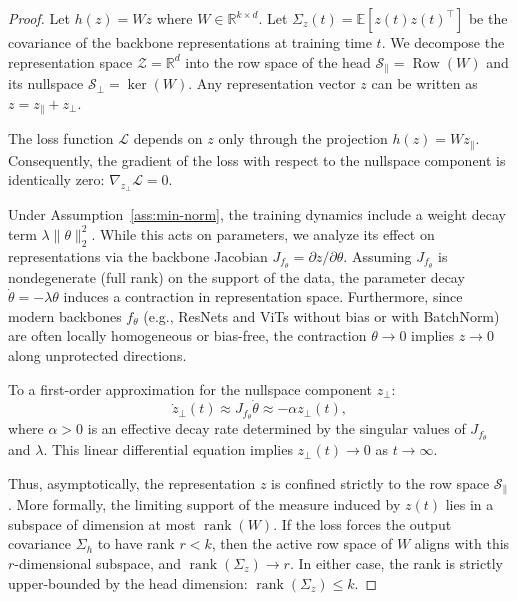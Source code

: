 \documentclass[10pt,a4paper]{amsart}
\begin{document}
\begin{proof}
Let $h(z) = Wz$ where $W \in \mathbb{R}^{k \times d}$. Let $\Sigma_z(t) = \mathbb{E}[z(t) z(t)^\top]$ be the covariance of the backbone representations at training time $t$. We decompose the representation space $\mathcal{Z} = \mathbb{R}^d$ into the row space of the head $\mathcal{S}_{\parallel} = \operatorname{Row}(W)$ and its nullspace $\mathcal{S}_{\perp} = \ker(W)$.
Any representation vector $z$ can be written as $z = z_{\parallel} + z_{\perp}$.

The loss function $\mathcal{L}$ depends on $z$ only through the projection $h(z) = W z_{\parallel}$. Consequently, the gradient of the loss with respect to the nullspace component is identically zero: $\nabla_{z_{\perp}} \mathcal{L} = 0$.

Under Assumption~\ref{ass:min-norm}, the training dynamics include a weight decay term $\lambda \|\theta\|^2_2$. While this acts on parameters, we analyze its effect on representations via the backbone Jacobian $J_{f_\theta} = \partial z / \partial \theta$. Assuming $J_{f_\theta}$ is nondegenerate (full rank) on the support of the data, the parameter decay $\dot{\theta} = -\lambda \theta$ induces a contraction in representation space. 
Furthermore, since modern backbones $f_\theta$ (e.g., ResNets and ViTs without bias or with BatchNorm) are often locally homogeneous or bias-free, the contraction $\theta \to 0$ implies $z \to 0$ along unprotected directions.

To a first-order approximation for the nullspace component $z_{\perp}$:
\begin{equation*}
    \dot{z}_{\perp}(t) \approx J_{f_\theta} \dot{\theta} \approx -\alpha z_{\perp}(t),
\end{equation*}
where $\alpha > 0$ is an effective decay rate determined by the singular values of $J_{f_\theta}$ and $\lambda$.
This linear differential equation implies $z_{\perp}(t) \to 0$ as $t \to \infty$.

Thus, asymptotically, the representation $z$ is confined strictly to the row space $\mathcal{S}_{\parallel}$. More formally, the limiting support of the measure induced by $z(t)$ lies in a subspace of dimension at most $\operatorname{rank}(W)$. If the loss forces the output covariance $\Sigma_h$ to have rank $r < k$, then the active row space of $W$ aligns with this $r$-dimensional subspace, and $\operatorname{rank}(\Sigma_z) \to r$. In either case, the rank is strictly upper-bounded by the head dimension: $\operatorname{rank}(\Sigma_z) \le k$.
\end{proof}
\end{document}
